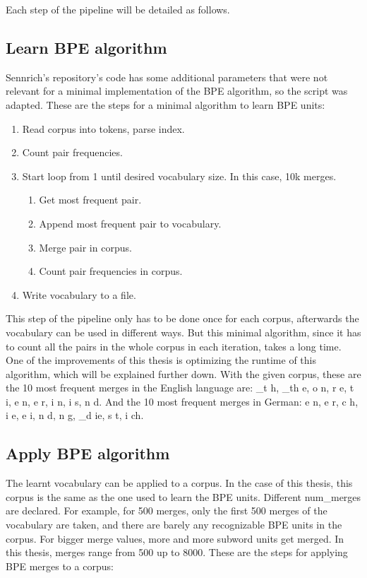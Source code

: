 Each step of the pipeline will be detailed as follows.

\subsection{Learn BPE algorithm}\label{met:learnbpe}

Sennrich's repository's code has some additional parameters that were not relevant for a minimal implementation of the BPE algorithm, so the script was adapted. These are the steps for a minimal algorithm to learn BPE units:

\begin{enumerate}
	\item Read corpus into tokens, parse index.
	\item Count pair frequencies.
	\item Start loop from 1 until desired vocabulary size. In this case, 10k merges.
	\begin{enumerate}
		\item Get most frequent pair.
		\item Append most frequent pair to vocabulary.
		\item Merge pair in corpus.
		\item Count pair frequencies in corpus.
	\end{enumerate}
	\item Write vocabulary to a file.
\end{enumerate}

This step of the pipeline only has to be done once for each corpus, afterwards the vocabulary can be used in different ways. But this minimal algorithm, since it has to count all the pairs in the whole corpus in each iteration, takes a long time. One of the improvements of this thesis is optimizing the runtime of this algorithm, which will be explained further down. With the given corpus, these are the 10 most frequent merges in the English language are: \_t h, \_th e, o n, r e, t i, e n, e r, i n, i s, n d. And the 10 most frequent merges in German: e n, e r, c h, i e, e i, n d, n g, \_d ie, s t, i ch.

\subsection{Apply BPE algorithm}\label{met:applybpe}

The learnt vocabulary can be applied to a corpus. In the case of this thesis, this corpus is the same as the one used to learn the BPE units. Different num\_merges are declared. For example, for 500 merges, only the first 500 merges of the vocabulary are taken, and there are barely any recognizable BPE units in the corpus. For bigger merge values, more and more subword units get merged. In this thesis, merges range from 500 up to 8000. These are the steps for applying BPE merges to a corpus:

